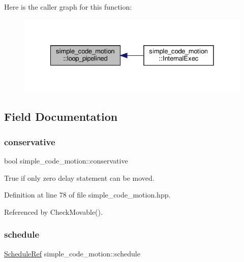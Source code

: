 Here is the caller graph for this function\+:
\nopagebreak
\begin{figure}[H]
\begin{center}
\leavevmode
\includegraphics[width=328pt]{d5/d58/classsimple__code__motion_a639c97e219cb7d49b9cb451b5085d3bb_icgraph}
\end{center}
\end{figure}


\subsection{Field Documentation}
\mbox{\label{classsimple__code__motion_a0bf7b69fea8137b06ee659620aaad238}} 
\subsubsection{\texorpdfstring{conservative}{conservative}}
{\footnotesize\ttfamily bool simple\+\_\+code\+\_\+motion\+::conservative\hspace{0.3cm}{\ttfamily [private]}}



True if only zero delay statement can be moved. 



Definition at line 78 of file simple\+\_\+code\+\_\+motion.\+hpp.



Referenced by Check\+Movable().

\mbox{\label{classsimple__code__motion_aa7519142b3b0fe26b2da83a0b5a4bdae}} 
\subsubsection{\texorpdfstring{schedule}{schedule}}
{\footnotesize\ttfamily \hyperlink{schedule_8hpp_af67f402958b3b52a1ec5cc4ce08ae3b9}{Schedule\+Ref} simple\+\_\+code\+\_\+motion\+::schedule\hspace{0.3cm}{\ttfamily [private]}}



